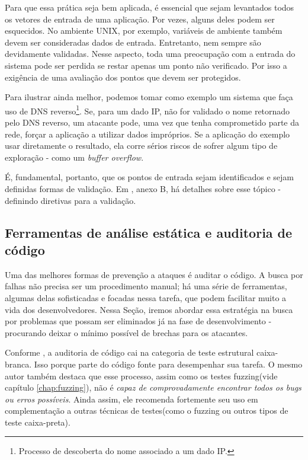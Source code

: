 			Para que essa prática seja bem aplicada, é essencial que sejam levantados todos os vetores
			de entrada de uma aplicação. Por vezes, alguns deles podem ser esquecidos. No ambiente UNIX,
			por exemplo, variáveis de ambiente também devem ser consideradas dados de entrada. Entretanto,
			nem sempre são devidamente validadas. Nesse aspecto, toda uma preocupação com a entrada
			do sistema pode ser perdida se restar apenas um ponto não verificado. Por isso a exigência
			de uma avaliação dos pontos que devem ser protegidos.


			Para ilustrar ainda melhor, podemos tomar como exemplo um sistema que faça uso de 
			DNS reverso\footnote{Processo de descoberta do nome associado a um dado IP.}. Se, para um
			dado IP, não for validado o nome retornado pelo DNS reverso, um atacante pode, uma vez que
			tenha comprometido parte da rede, forçar a aplicação a utilizar dados impróprios.
			Se a aplicação do exemplo usar diretamente o resultado, ela corre sérios riscos de sofrer
			algum tipo de exploração - como um \textsl{buffer overflow}.


			É, fundamental, portanto, que os pontos de entrada sejam identificados e sejam
			definidas formas de validação. Em \cite{Secure2006}, anexo B, há detalhes sobre
			esse tópico - definindo diretivas para a validação.
			
		\subsection{Ferramentas de análise estática e auditoria de código}
			Uma das melhores formas de prevenção a ataques é auditar o código. 
			A busca por falhas não precisa ser um procedimento manual; há uma série de ferramentas,
			algumas delas sofisticadas e focadas nessa tarefa, que podem facilitar muito a vida
			dos desenvolvedores.
			Nessa Seção, iremos abordar essa estratégia na busca por problemas 
			que possam ser eliminados já na fase de desenvolvimento - procurando
			deixar o mínimo possível de brechas para os atacantes.
			
			
			Conforme \cite{Ari2008}, a auditoria de código cai na categoria de teste
			estrutural caixa-branca. Isso porque parte do código fonte para desempenhar sua tarefa.
			O mesmo autor também destaca que esse processo,
			assim como os testes fuzzing(vide capítulo \ref{chap:fuzzing}), não é
			\textsl{capaz de comprovadamente encontrar todos os \textsl{bugs} ou erros possíveis}. 
			Ainda assim, ele recomenda fortemente seu uso em complementação a outras técnicas
			de testes(como o fuzzing ou outros tipos de teste caixa-preta).


